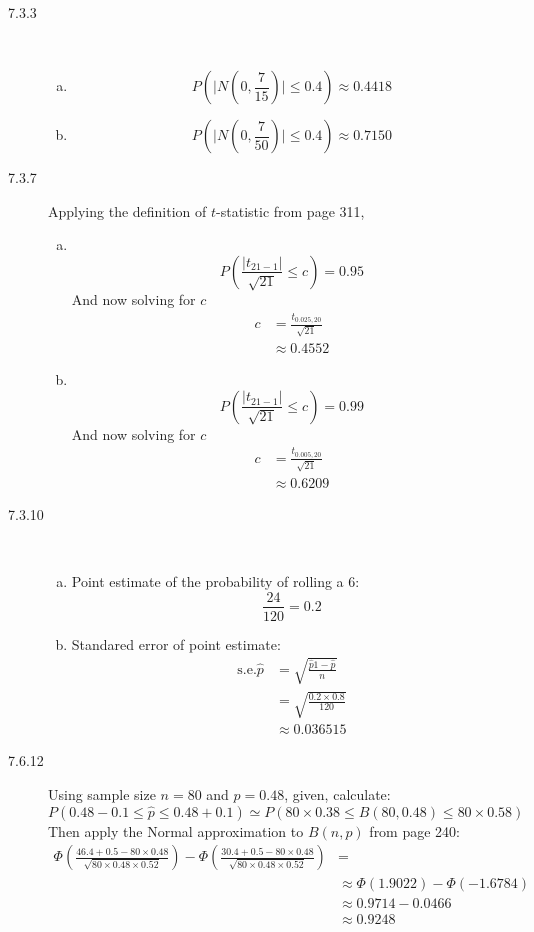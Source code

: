 \documentclass[letterpaper,10pt]{article}
\begin{document}
\begin{description}
\item[7.3.3]\  %
\begin{enumerate}[a)]
\item \[P(\mid N(0,\frac{7}{15})\mid\leq 0.4) \approx 0.4418\]
\item \[P(\mid N(0,\frac{7}{50})\mid\leq 0.4) \approx 0.7150\]
\end{enumerate}

\item[7.3.7]
Applying the definition of $t$-statistic from page 311,
\begin{enumerate}[a)] 
\item \
\[P(\frac{\left| t_{21-1}\right|}{\sqrt{21}} \leq c) = 0.95\]
And now solving for $c$
\begin{align*}
c &= \frac{t_{0.025,20}}{\sqrt{21}} \\
&\approx 0.4552
\end{align*}
\item \ 
\[P(\frac{\left| t_{21-1}\right|}{\sqrt{21}} \leq c) = 0.99\]
And now solving for $c$
\begin{align*}
c &= \frac{t_{0.005,20}}{\sqrt{21}} \\
&\approx 0.6209
\end{align*}
\end{enumerate}

\item[7.3.10]\ 
\begin{enumerate}[a)]
\item Point estimate of the probability of rolling a 6:
\[\frac{24}{120} = 0.2\]
\item Standared error of point estimate:
\begin{align*}
\mbox{s.e.}\hat{p} &= \sqrt{\frac{\hat{p}1-\hat{p}}{n}} \\
&= \sqrt{\frac{0.2\times 0.8}{120}} \\
&\approx 0.036515
\end{align*}
\end{enumerate}

\item[7.6.12] %
Using sample size $n=80$ and $p=0.48$, given, calculate:
\[P(0.48-0.1\leq\hat{p}\leq0.48+0.1)\simeq P(80\times0.38\leq B(80,0.48)\leq 80\times 0.58)\]
Then apply the Normal approximation to $B(n,p)$ from page 240:
\begin{align*}
\Phi(\frac{46.4+0.5-80\times 0.48}{\sqrt{80\times 0.48\times 0.52}})-\Phi(\frac{30.4+0.5-80\times 0.48}{\sqrt{80\times 0.48\times 0.52}}) &= \\
&\approx \Phi(1.9022)-\Phi(-1.6784) \\
&\approx 0.9714-0.0466 \\
&\approx 0.9248
\end{align*}

\end {description}
\end{document}

